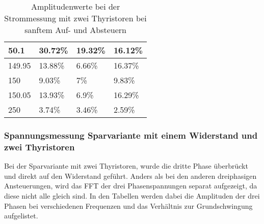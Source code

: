 \begin{table}[ht]
\begin{tabular}{|l|l|l|l|}
		50.1              & 30.72\%                                                                             & 19.32\%                                                                             & 16.12\%                                                                             \\ \hline
		149.95            & 13.88\%                                                                             & 6.66\%                                                                              & 16.37\%                                                                             \\ \hline
		150               & 9.03\%                                                                              & 7\%                                                                                 & 9.83\%                                                                              \\ \hline
		150.05            & 13.93\%                                                                             & 6.9\%                                                                               & 16.29\%                                                                             \\ \hline
		250		          & 3.74\%                                                                             & 3.46\%                                                                               & 2.59\%                                                                             \\ \hline
	\end{tabular}
	\caption{Amplitudenwerte bei der Strommessung mit zwei Thyristoren bei sanftem Auf- und Absteuern}\label{tab:Mess_2Thyristoren_Spannung_Widerstand_AufAb_sanft_stroeme}
\end{table}

\newpage
\subsubsection{Spannungsmessung Sparvariante mit einem Widerstand und zwei Thyristoren}
Bei der Sparvariante mit zwei Thyristoren, wurde die dritte Phase überbrückt und direkt auf den Widerstand geführt. Anders als bei den anderen dreiphasigen Ansteuerungen, wird das FFT der drei Phasenspannungen separat aufgezeigt, da diese nicht alle gleich sind. In den Tabellen werden dabei die Amplituden der drei Phasen bei verschiedenen Frequenzen und das Verhältnis zur Grundschwingung aufgelistet. 

